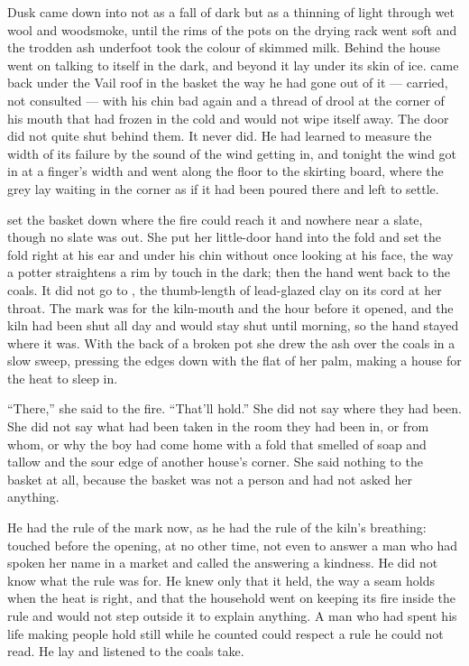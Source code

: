 Dusk came down into  not as a fall of dark but as a thinning of light through wet wool and woodsmoke, until the rims of the pots on the drying rack went soft and the trodden ash underfoot took the colour of skimmed milk. Behind the house  went on talking to itself in the dark, and beyond it  lay under its skin of ice.  came back under the Vail roof in the basket the way he had gone out of it --- carried, not consulted --- with his chin bad again and a thread of drool at the corner of his mouth that had frozen in the cold and would not wipe itself away. The door did not quite shut behind them. It never did. He had learned to measure the width of its failure by the sound of the wind getting in, and tonight the wind got in at a finger's width and went along the floor to the skirting board, where the grey lay waiting in the corner as if it had been poured there and left to settle.

 set the basket down where the fire could reach it and nowhere near a slate, though no slate was out. She put her little-door hand into the fold and set the fold right at his ear and under his chin without once looking at his face, the way a potter straightens a rim by touch in the dark; then the hand went back to the coals. It did not go to , the thumb-length of lead-glazed clay on its cord at her throat. The mark was for the kiln-mouth and the hour before it opened, and the kiln had been shut all day and would stay shut until morning, so the hand stayed where it was. With the back of a broken pot she drew the ash over the coals in a slow sweep, pressing the edges down with the flat of her palm, making a house for the heat to sleep in.

“There,” she said to the fire. “That'll hold.” She did not say where they had been. She did not say what had been taken in the room they had been in, or from whom, or why the boy had come home with a fold that smelled of soap and tallow and the sour edge of another house's corner. She said nothing to the basket at all, because the basket was not a person and had not asked her anything.

He had the rule of the mark now, as he had the rule of the kiln's breathing: touched before the opening, at no other time, not even to answer a man who had spoken her name in a market and called the answering a kindness. He did not know what the rule was for. He knew only that it held, the way a seam holds when the heat is right, and that the household went on keeping its fire inside the rule and would not step outside it to explain anything. A man who had spent his life making people hold still while he counted could respect a rule he could not read. He lay and listened to the coals take.

